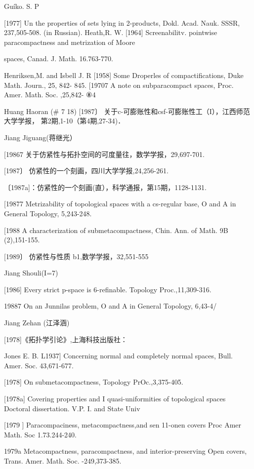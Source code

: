 \documentclass[main.tex]{subfiles}
\begin{document}
Guíko. S. P

[1977]
Un
the properties of sets lying in 2-products, Dokl. Acad. Nauk.
SSSR, 237,505-508. (in Russian).
Heath,R. W.
[1964]
Screenabilitv. pointwise paracompactness and
metrization of Moore

spaces, Canad. J. Math. 16.763-770.

\noindent Henriksen,M. and Isbell J. R
[1958]
Some Droperles
of compactifications, Duke Math. Journ., 25, 842-
845.
[19707 A note on subparacompact spaces, Proc. Amer. Math. Soc. ,25,842-
⑧4

\noindent Huang Haoran (# 7 18)
[1987〕 关于c-可膨账性和csf-可膨账性工（I），江西师范大学学报，
第2期,1-10（第4期,27-34)．

\noindent Jiang Jiguang(蒋继光）

[19867 关于仿紧性与拓扑空间的可度量往，数学学报，29,697-701.

[1987〕 仿紧性的一个刻画，四川大学学报,24,256-261.

〔1987a]：仿紧性的一个刻画(直），科学通报，第15期，1128-1131.

[19877 Metrizability of topological spaces with a cs-regular base, O and A
in General Topology, 5,243-248.

[1988 A characterization of submetacompactness, Chin. Ann. of Math. 9B
(2),151-155.

[1989〕 仿紧性与性质 b1,数学学报，32,551-555

\noindent Jiang Shouli(I=7)

[1986] Every strict p-space is 6-refinable. Topology Proc.,11,309-316.

19887 On an Junnilas problem, O and A in General Topology, 6,43-4/

Jiang Zehan (江泽涵)

[1978]《拓扑学引论》,上海科技出版社：

\noindent Jones E. B.
L1937] Concerning normal and completely normal spaces, Bull. Amer. Soc.
43,671-677.

[1978]
On submetacompactness, Topology PrOc.,3,375-405.

[1978a]
Covering properties and
I quasi-uniformities of topological spaces
Doctoral dissertation. V.P. I. and State Univ

[1979 ]
Paracompaciness,
metacompactness,and
sen
11-onen
covers
Proc
Amer Math. Soc
1.73.244-240.

1979a Metacompactness, paracompactness, and
interior-preserving Open
covers, Trans. Amer. Math. Soc. -249,373-385.
\end{document}
